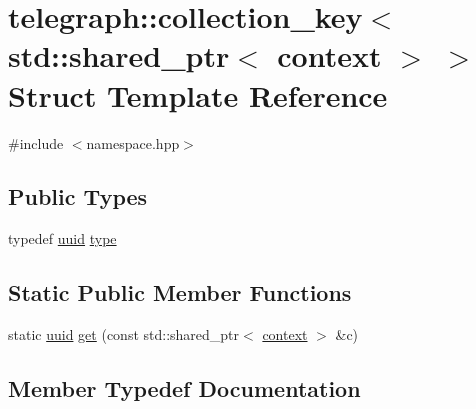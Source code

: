 \hypertarget{structtelegraph_1_1collection__key_3_01std_1_1shared__ptr_3_01context_01_4_01_4}{}\section{telegraph\+:\+:collection\+\_\+key$<$ std\+:\+:shared\+\_\+ptr$<$ context $>$ $>$ Struct Template Reference}
\label{structtelegraph_1_1collection__key_3_01std_1_1shared__ptr_3_01context_01_4_01_4}


{\ttfamily \#include $<$namespace.\+hpp$>$}

\subsection*{Public Types}
\begin{DoxyCompactItemize}
\item 
typedef \hyperlink{namespacetelegraph_a51ee91d7eaeef067f7ccac2b170e5d59}{uuid} \hyperlink{structtelegraph_1_1collection__key_3_01std_1_1shared__ptr_3_01context_01_4_01_4_af7ea62096d0cff1cce249a8b4ad37f8b}{type}
\end{DoxyCompactItemize}
\subsection*{Static Public Member Functions}
\begin{DoxyCompactItemize}
\item 
static \hyperlink{namespacetelegraph_a51ee91d7eaeef067f7ccac2b170e5d59}{uuid} \hyperlink{structtelegraph_1_1collection__key_3_01std_1_1shared__ptr_3_01context_01_4_01_4_a35cb92d2d9c4516b4a0b9891f177cf05}{get} (const std\+::shared\+\_\+ptr$<$ \hyperlink{classtelegraph_1_1context}{context} $>$ \&c)
\end{DoxyCompactItemize}


\subsection{Member Typedef Documentation}
\mbox{\label{structtelegraph_1_1collection__key_3_01std_1_1shared__ptr_3_01context_01_4_01_4_af7ea62096d0cff1cce249a8b4ad37f8b}} 
